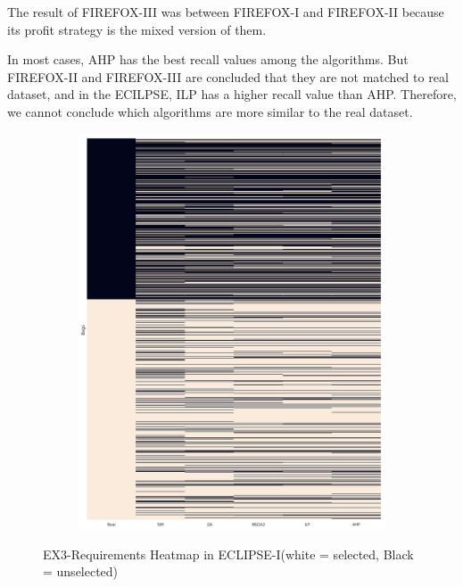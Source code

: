 The result of FIREFOX-III was between FIREFOX-I and FIREFOX-II because its profit strategy is the mixed version of them. 

In most cases, AHP has the best recall values among the algorithms. But FIREFOX-II and FIREFOX-III are concluded that they are not matched to real dataset, and in the ECILPSE, ILP has a higher recall value than AHP. Therefore, we cannot conclude which algorithms are more similar to the real dataset.


\begin{figure}[h]
\centering
  \begin{subfigure}[b]{0.95\linewidth}
    \includegraphics[width=\linewidth]{images/heatmap_ec.png}
  \end{subfigure}
  \caption{EX3-Requirements Heatmap in ECLIPSE-I(white = selected, Black = unselected)}
  \label{fig:EclipseHeatmap}
\end{figure}
